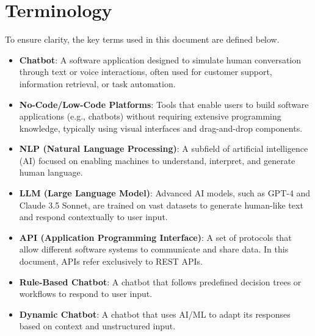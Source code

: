 \section{Terminology}
To ensure clarity, the key terms used in this document are defined below.
\begin{itemize}
    \item \textbf{Chatbot}: A software application designed to simulate human conversation through text or voice interactions, often used for customer support, information retrieval, or task automation.
    \item \textbf{No-Code/Low-Code Platforms}: Tools that enable users to build software applications (e.g., chatbots) without requiring extensive programming knowledge, typically using visual interfaces and drag-and-drop components.
    \item \textbf{NLP (Natural Language Processing)}: A subfield of artificial intelligence (AI) focused on enabling machines to understand, interpret, and generate human language.
    \item \textbf{LLM (Large Language Model)}: Advanced AI models, such as GPT-4 and Claude 3.5 Sonnet, are trained on vast datasets to generate human-like text and respond contextually to user input.
    \item \textbf{API (Application Programming Interface)}: A set of protocols that allow different software systems to communicate and share data. In this document, APIs refer exclusively to REST APIs.
    \item \textbf{Rule-Based Chatbot}: A chatbot that follows predefined decision trees or workflows to respond to user input.
    \item \textbf{Dynamic Chatbot}: A chatbot that uses AI/ML to adapt its responses based on context and unstructured input.
\end{itemize}

